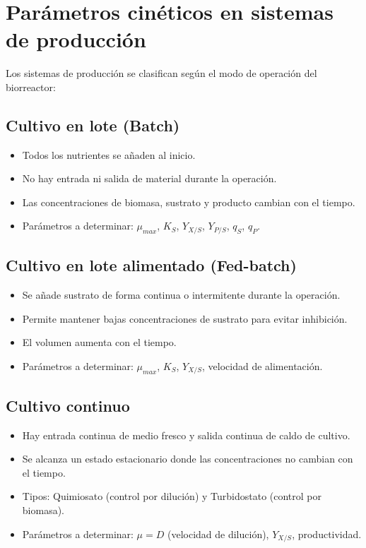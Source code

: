 
\section{Parámetros cinéticos en sistemas de producción}

Los sistemas de producción se clasifican según el modo de operación del biorreactor:

\subsection{Cultivo en lote (Batch)}
\begin{itemize}
    \item Todos los nutrientes se añaden al inicio.
    \item No hay entrada ni salida de material durante la operación.
    \item Las concentraciones de biomasa, sustrato y producto cambian con el tiempo.
    \item Parámetros a determinar: $\mu_{max}$, $K_S$, $Y_{X/S}$, $Y_{P/S}$, $q_S$, $q_P$.
\end{itemize}

\subsection{Cultivo en lote alimentado (Fed-batch)}
\begin{itemize}
    \item Se añade sustrato de forma continua o intermitente durante la operación.
    \item Permite mantener bajas concentraciones de sustrato para evitar inhibición.
    \item El volumen aumenta con el tiempo.
    \item Parámetros a determinar: $\mu_{max}$, $K_S$, $Y_{X/S}$, velocidad de alimentación.
\end{itemize}

\subsection{Cultivo continuo}
\begin{itemize}
    \item Hay entrada continua de medio fresco y salida continua de caldo de cultivo.
    \item Se alcanza un estado estacionario donde las concentraciones no cambian con el tiempo.
    \item Tipos: Quimiosato (control por dilución) y Turbidostato (control por biomasa).
    \item Parámetros a determinar: $\mu = D$ (velocidad de dilución), $Y_{X/S}$, productividad.
\end{itemize}

